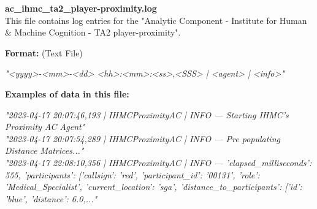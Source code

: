 \begin{description}
\begin{addmargin}[0em]{0em}
    \label{ac_ihmc_ta2_player-proximity.log}
    \begin{addmargin}[1em]{0em} %
        \textbf{ac\_ihmc\_ta2\_player-proximity.log}\\
        This file contains log entries for the "Analytic Component - Institute for Human \& Machine Cognition - TA2 player-proximity".
        \begin{addmargin}[1em]{0em}
            \textbf{Format:} (Text File)
            \begin{addmargin}[1em]{0em}
                \textit{"<yyyy>-<mm>-<dd> <hh>:<mm>:<ss>,<SSS> | <agent> | <info>"}
            \end{addmargin}
        \end{addmargin}
        \begin{addmargin}[1em]{0em}
            \textbf{Examples of data in this file:}
            \begin{addmargin}[1em]{0em}\textit{"2023-04-17 20:07:46,193 | IHMCProximityAC | INFO — Starting IHMC's Proximity AC Agent"\\
                "2023-04-17 20:07:54,289 | IHMCProximityAC | INFO — Pre populating Distance Matrices..."\\
                "2023-04-17 22:08:10,356 | IHMCProximityAC | INFO — 'elapsed\_milliseconds': 555, 'participants': ['callsign': 'red',
                'participant\_id': '00131', 'role': 'Medical\_Specialist', 'current\_location': 'sga', 'distance\_to\_participants': ['id': 'blue', 'distance': 6.0,..."}
            \end{addmargin}
        \end{addmargin}
    \end{addmargin} %
    \textbf{\\}


\end{addmargin}
\end{description}
